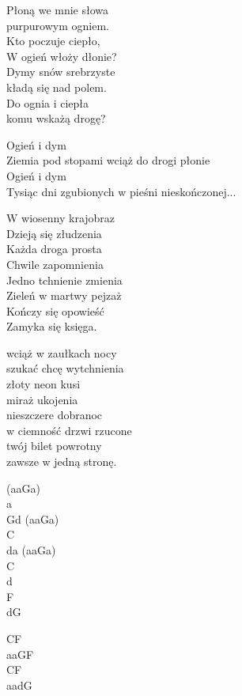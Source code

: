 \begin{text}
\hfill\break
Płoną we mnie słowa\\
purpurowym ogniem.\\
Kto poczuje ciepło,\\
W ogień włoży dłonie?\\
Dymy snów srebrzyste\\
kładą się nad polem.\\
Do ognia i ciepła\\
komu wskażą drogę?

Ogień i dym\\
Ziemia pod stopami wciąż do drogi płonie\\
Ogień i dym\\
Tysiąc dni zgubionych w pieśni nieskończonej...

W wiosenny krajobraz\\
Dzieją się złudzenia\\
Każda droga prosta\\
Chwile zapomnienia\\
Jedno tchnienie zmienia\\
Zieleń w martwy pejzaż\\
Kończy się opowieść\\
Zamyka się księga.

wciąż w zaułkach nocy\\
szukać chcę wytchnienia\\
złoty neon kusi\\
miraż ukojenia\\
nieszczere dobranoc\\
w ciemność drzwi rzucone\\
twój bilet powrotny\\
zawsze w jedną stronę.
\end{text}
\begin{chord}
(aaGa)\\
a\\
Gd (aaGa)\\
C\\
da (aaGa)\\
C\\
d\\
F\\
dG

CF\\
aaGF\\
CF\\
aadG
\end{chord}